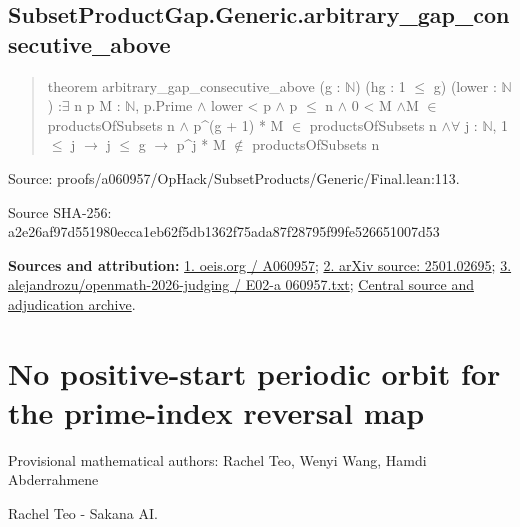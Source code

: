 \documentclass[11pt,a4paper]{article}
\begin{document}
\begin{samepage}
\subsection{SubsetProductGap.Generic.arbitrary\_gap\_consecutive\_above}
\begin{quote}\small\ttfamily theorem arbitrary\_gap\_consecutive\_above (g : \ensuremath{\mathbb{N}}) (hg : 1 \ensuremath{\leq} g) (lower : \ensuremath{\mathbb{N}}) :\newline     \ensuremath{\exists} n p M : \ensuremath{\mathbb{N}}, p.Prime \ensuremath{\wedge} lower < p \ensuremath{\wedge} p \ensuremath{\leq} n \ensuremath{\wedge} 0 < M \ensuremath{\wedge}\newline       M \ensuremath{\in} productsOfSubsets n \ensuremath{\wedge} p\textasciicircum{}(g + 1) * M \ensuremath{\in} productsOfSubsets n \ensuremath{\wedge}\newline         \ensuremath{\forall} j : \ensuremath{\mathbb{N}}, 1 \ensuremath{\leq} j \ensuremath{\to} j \ensuremath{\leq} g \ensuremath{\to} p\textasciicircum{}j * M \ensuremath{\notin} productsOfSubsets n\end{quote}
{\small Source: proofs/a060957/OpHack/SubsetProducts/Generic/Final.lean:113.\par}

{\small Source SHA-256: a2e26af97d551980ecca1eb62f5db1362f75ada87f28795f99fe526651007d53\par}

{\small\textbf{Sources and attribution:} \href{https://oeis.org/A060957}{1. oeis.org / A060957}; \href{https://arxiv.org/abs/2501.02695}{2. arXiv source: 2501.02695}; \href{https://github.com/alejandrozu/openmath-2026-judging/blob/d0ed487f487fa7ec814ff705ab55249983fe8707/OpenMath-Judging/review/entries/E02-a060957.txt}{3. alejandrozu/openmath-2026-judging / E02-a 060957.txt}; \href{https://github.com/alejandrozu/openmath-2026-judging}{Central source and adjudication archive}.\par}

\end{samepage}
\clearpage
\section{No positive-start periodic orbit for the prime-index reversal map}
{\small Provisional mathematical authors: Rachel Teo, Wenyi Wang, Hamdi Abderrahmene\par}\medskip
{\small Rachel Teo  -  Sakana AI.\par}
\end{document}
